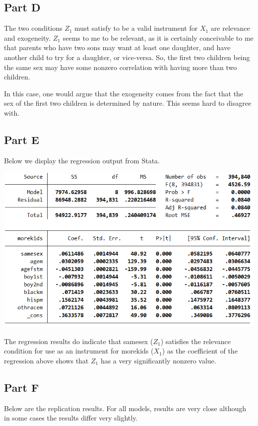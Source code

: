 \documentclass[11pt]{article} %
\begin{document}
\subsection{Part D}

The two conditions $Z_1$ must satisfy to be a valid instrument for $X_1$ are relevance and exogeneity. $Z_1$ seems to me to be relevant, as it is certainly conceivable to me that parents who have two sons may want at least one daughter, and have another child to try for a daughter, or vice-versa. So, the first two children being the same sex may have some nonzero correlation with having more than two children.

In this case, one would argue that the exogeneity comes from the fact that the sex of the first two children is determined by nature. This seems hard to disagree with.
\subsection{Part E}
Below we display the regression output from Stata.

\includegraphics{hw2q4}

The regression results do indicate that samesex ($Z_1$) satisfies the relevance condition for use as an instrument for morekids ($X_1$) as the coefficient of the regression above shows that $Z_1$ has a very significantly nonzero value.

\subsection{Part F}
Below are the replication results. For all models, results are very close although in some cases the results differ very slightly.
\begin{center}

\end{center}
\end{document}

